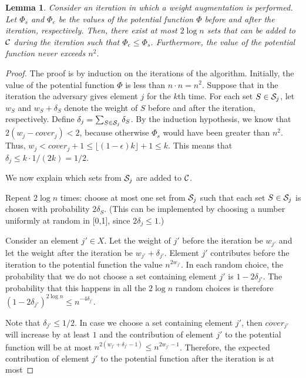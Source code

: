 \documentclass{sig-alternate}
\newtheorem{lemma}[theorem]{Lemma}
\def \CC   {{\cal C}}
\def \SS   {{\cal S}}
\begin{document}
\begin{lemma}\label{det_poten}
Consider an iteration in which a weight augmentation is performed.
Let $\Phi_s$ and $\Phi_e$ be the values of the potential function
$\Phi$ before and after the iteration, respectively. Then, there
exist at most $2 \log n$ sets that can be added to $\CC$ during
the iteration such that $\Phi_e \leq \Phi_s$. Furthermore, the
value of the potential function never exceeds $n^2$.
\end{lemma}

\begin{proof}
The proof is by induction on the iterations of the algorithm.
Initially, the value of the potential function $\Phi$ is less than
$n \cdot n = n^2$. Suppose that in the iteration the adversary
gives element $j$ for the $k$th time. For each set $S \in \SS_j$,
let $w_S$ and $w_S + \delta_S$ denote the weight of $S$ before and
after the iteration, respectively. Define $\delta_j = \sum_{S \in
\SS_j} \delta_S$. By the induction hypothesis, we know that $2(w_j
- cover_j) < 2$, because otherwise $\Phi_s$ would have been
greater than $n^2$. Thus, $w_j < cover_j + 1 \leq \lfloor
(1-\epsilon)k \rfloor + 1 \leq k$. This means that $\delta_j \leq
k \cdot 1/(2k) = 1/2$.

We now explain which sets from $\SS_j$ are added to $\CC$.

Repeat $2 \log n$ times: choose at most one set from $\SS_j$ such
that each set $S \in \SS_j$ is chosen with probability
$2\delta_S$. (This can be implemented by choosing a number
uniformly at random in [0,1], since $2\delta_j \leq 1$.)

Consider an element $j' \in X$. Let the weight of $j'$ before the
iteration be $w_{j'}$ and let the weight after the iteration be
$w_{j'}+\delta_{j'}$. Element $j'$ contributes before the
iteration to the potential function the value $n^{2w_{j'}}$. In
each random choice, the probability that we do not choose a set
containing element $j'$ is $1 - 2\delta_{j'}$. The probability
that this happens in all the $2 \log n$ random choices is
therefore $(1 - 2\delta_{j'})^{2 \log n} \leq n^{-4\delta_{j'}}$.

Note that $\delta_{j'} \leq 1/2$. In case we choose a set
containing element $j'$, then $cover_{j'}$ will increase by at
least $1$ and the contribution of element $j'$ to the potential
function will be at most $n^{2(w_{j'}+\delta_{j'}-1)} \leq
n^{2w_{j'}-1}$. Therefore, the expected contribution of element
$j'$ to the potential function after the iteration is at most


\end{proof}
\end{document}
